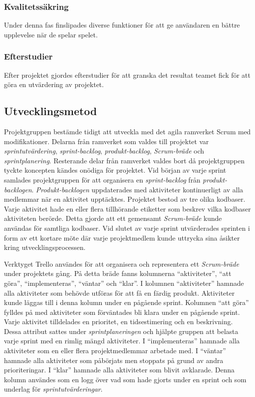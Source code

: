\subsubsection*{Kvalitetssäkring}
Under denna fas finslipades diverse funktioner för att ge användaren en bättre upplevelse när de spelar spelet.

\subsubsection*{Efterstudier}
Efter projektet gjordes efterstudier för att granska det resultat teamet fick för att göra en utvärdering av projektet.

\subsection{Utvecklingsmetod}
Projektgruppen bestämde tidigt att utveckla med det agila ramverket Scrum med modifikationer. Delarna från ramverket som valdes till projektet var \textit{sprintutvärdering}, \textit{sprint-backlog}, \textit{produkt-backlog}, \textit{Scrum-bräde} och \textit{sprintplanering}. Resterande delar från ramverket valdes bort då projektgruppen tyckte koncepten kändes onödiga för projektet. Vid början av varje sprint samlades projektgruppen för att organisera en \textit{sprint-backlog} från \textit{produkt-backlogen}. \textit{Produkt-backlogen} uppdaterades med aktiviteter kontinuerligt av alla medlemmar när en aktivitet upptäcktes. Projektet bestod av tre olika kodbaser. Varje aktivitet hade en eller flera tillhörande etiketter som beskrev vilka kodbaser aktiviteten berörde. Detta gjorde att ett gemensamt \textit{Scrum-bräde} kunde användas för samtliga kodbaser. Vid slutet av varje sprint utvärderades sprinten i form av ett kortare möte där varje projektmedlem kunde uttrycka sina åsikter kring utvecklingsprocessen. 

Verktyget Trello användes för att organisera och representera ett \textit{Scrum-bräde} under projektets gång. På detta bräde fanns kolumnerna ``aktiviteter'', ``att göra'', ``implementeras'', ``väntar'' och ``klar''. I kolumnen ``aktiviteter'' hamnade alla aktiviteter som behövde utföras för att få en färdig produkt. Aktiviteter kunde läggas till i denna kolumn under en pågående sprint. Kolumnen ``att göra'' fylldes på med aktiviteter som förväntades bli klara under en pågående sprint. Varje aktivitet tilldelades en prioritet, en tidsestimering och en beskrivning. Dessa attribut sattes under \textit{sprintplaneringen} och hjälpte gruppen att belasta varje sprint med en rimlig mängd aktiviteter. I ``implementeras'' hamnade alla aktiviteter som en eller flera projektmedlemmar arbetade med. I ``väntar'' hamnade alla aktiviteter som påbörjats men stoppats på grund av andra prioriteringar. I ``klar'' hamnade alla aktiviteter som blivit avklarade. Denna kolumn användes som en logg över vad som hade gjorts under en sprint och som underlag för \textit{sprintutvärderingar}.


